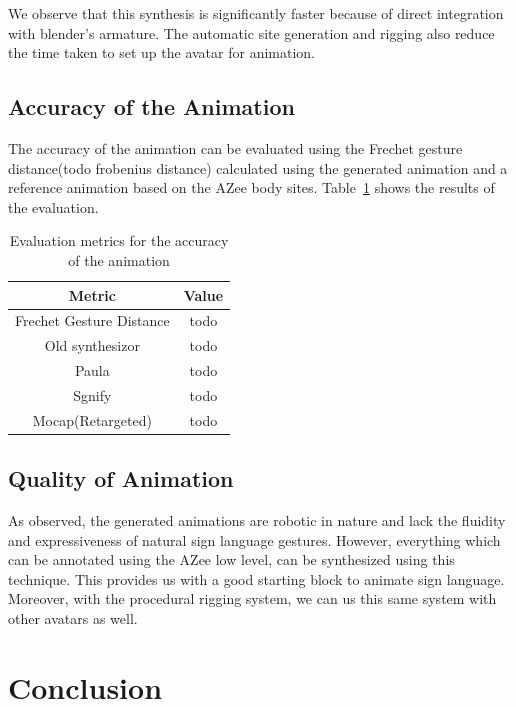 \documentclass[../../main.tex]{subfiles}
\begin{document}
We observe that this synthesis is significantly faster because of direct integration with blender's armature. The automatic site generation and rigging also reduce the time taken to set up the avatar for animation.

\subsection{Accuracy of the Animation}
\label{ch:rigging_layers:evaluation:accuracy}

The accuracy of the animation can be evaluated using the Frechet gesture distance(todo frobenius distance) calculated using the generated animation and a reference animation based on the AZee body sites. Table~\ref{tab:accuracy_metrics} shows the results of the evaluation.

\begin{table}
    \centering
    \begin{tabular}{|c|c|}
        \hline
        \textbf{Metric} & \textbf{Value} \\
        \hline
        Frechet Gesture Distance & todo \\
        Old synthesizor & todo \\
        Paula & todo \\
        Sgnify & todo \\
        Mocap(Retargeted) & todo \\
        \hline
    \end{tabular}
    \caption{Evaluation metrics for the accuracy of the animation}
    \label{tab:accuracy_metrics}
\end{table}

\subsection{Quality of Animation}
\label{ch:rigging_layers:evaluation:quality}

As observed, the generated animations are robotic in nature and lack the fluidity and expressiveness of natural sign language gestures. However, everything which can be annotated using the AZee low level, can be synthesized using this technique. This provides us with a good starting block to animate sign language. Moreover, with the procedural rigging system, we can us this same system with other avatars as well.

\section{Conclusion}
\label{ch:rigging_layers:conclusion}
\end{document}
